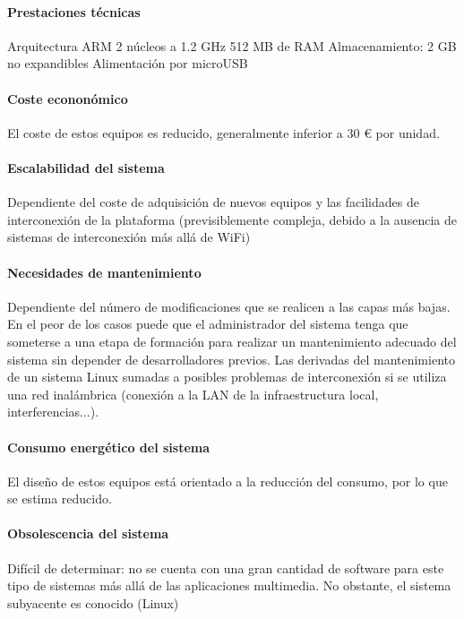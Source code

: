 \paragraph{Prestaciones técnicas}
Arquitectura ARM
2 núcleos a 1.2 GHz
512 MB de RAM
Almacenamiento: 2 GB no expandibles
Alimentación por microUSB

\paragraph{Coste econonómico}

El coste de estos equipos es reducido, generalmente inferior a 30 € por unidad.

\paragraph{Escalabilidad del sistema}

Dependiente del coste de adquisición de nuevos equipos y las facilidades de interconexión de la plataforma (previsiblemente compleja, debido a la ausencia de sistemas de interconexión más allá de WiFi)

\paragraph{Necesidades de mantenimiento}

Dependiente del número de modificaciones que se realicen a las capas más bajas. En el peor de los casos puede que el administrador del sistema tenga que someterse a una etapa de formación para realizar un mantenimiento adecuado del sistema sin depender de desarrolladores previos.
Las derivadas del mantenimiento de un sistema Linux sumadas a posibles problemas de interconexión si se utiliza una red inalámbrica (conexión a  la LAN de la infraestructura local, interferencias...).

\paragraph{Consumo energético del sistema}

El diseño de estos equipos está orientado a la reducción del consumo, por lo que se estima reducido.

\paragraph{Obsolescencia del sistema}

Difícil de determinar: no se cuenta con una gran cantidad de software para este tipo de sistemas más allá de las aplicaciones multimedia. No obstante, el sistema subyacente es conocido (Linux)

